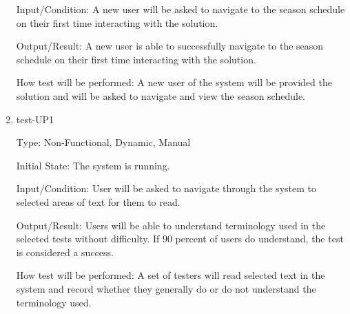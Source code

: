 \documentclass[12pt, titlepage]{article}
\begin{document}
\begin{enumerate}
  Input/Condition: A new user will be asked to navigate to the season schedule on their first
  time interacting with the solution.

  Output/Result: A new user is able to successfully navigate to the season schedule on
  their first time interacting with the solution.

  How test will be performed: A new user of the system will be provided the solution and
  will be asked to navigate and view the season schedule.

  \item{test-UP1\\}

  Type: Non-Functional, Dynamic, Manual

  Initial State: The system is running.

  Input/Condition: User will be asked to navigate through the system to 
  selected areas of text for them to read.

  Output/Result: Users will be able to understand terminology used in
  the selected tests without difficulty. If 90 percent of users do understand,
  the test is considered a success.

  How test will be performed: A set of testers will read selected text
  in the system and record whether they generally do or do not 
  understand the terminology used. 












\end{enumerate}
\end{document}
